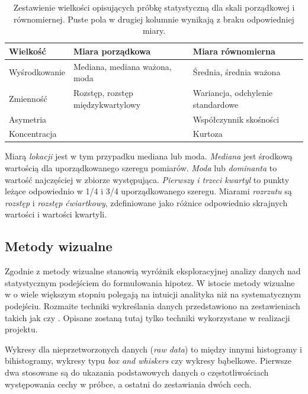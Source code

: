 \documentclass[12pt,a4paper,oneside]{report} %
\begin{document}
\begin{table}
\begin{tabular}{l|l|l}
Wielkość & Miara porządkowa & Miara równomierna  \\
\hline
Wyśrodkowanie & Mediana, mediana ważona, moda & Średnia, średnia ważona \\
Zmienność & Rozstęp, rozstęp międzykwartylowy & Wariancja, odchylenie standardowe \\
Asymetria &  & Współczynnik skośności \\
Koncentracja &  & Kurtoza \\
\end{tabular}
\caption[Zestawienie wielkości opisujących próbkę statystyczną dla skali porządkowej i równomiernej]{Zestawienie wielkości opisujących próbkę statystyczną dla skali porządkowej i równomiernej. Puste pola w drugiej kolumnie wynikają z braku odpowiedniej miary.}
\label{miary-statystyczne}
\end{table}

Miarą \emph{lokacji} jest w tym przypadku mediana lub moda. \emph{Mediana} jest środkową wartością dla uporządkowanego szeregu pomiarów. \emph{Moda} lub \emph{dominanta} to wartość najczęściej w zbiorze występująca. \emph{Pierwszy i trzeci kwartyl} to punkty leżące odpowiednio w 1/4 i 3/4 uporządkowanego szeregu. Miarami \emph{rozrzutu} są \emph{rozstęp} i \emph{rozstęp ćwiartkowy}, zdefiniowane jako różnice odpowiednio skrajnych wartości i wartości kwartyli. \par


\subsection{Metody wizualne}

Zgodnie z \cite{nist} metody wizualne stanowią wyróżnik eksploracyjnej analizy danych nad statystycznym podejściem do formułowania hipotez. W istocie metody wizualne w o wiele większym stopniu polegają na intuicji analityka niż na systematycznym podejściu. Rozmaite techniki wykreślania danych przedstawiono na zestawieniach takich jak \cite{visual-literacy} czy \cite{viz-catalogue}. Opisane zostaną tutaj tylko techniki wykorzystane w realizacji projektu. \par

Wykresy dla nieprzetworzonych danych (\emph{raw data}) to między innymi histogramy i bihistogramy, wykresy typu \emph{box and whiskers} czy wykresy bąbelkowe. Pierwsze dwa stosowane są do ukazania podstawowych danych o częstotliwościach występowania cechy w próbce, a ostatni do zestawiania dwóch cech. \par
\end{document}

